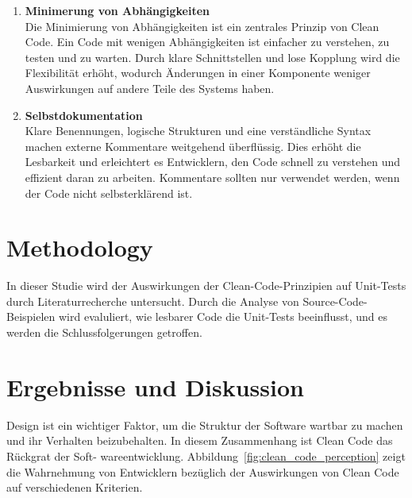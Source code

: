 \documentclass[conference]{IEEEtran}
\begin{document}
\begin{enumerate}
    \item \textbf{Minimerung von Abhängigkeiten}\\
    Die Minimierung von Abhängigkeiten ist ein zentrales Prinzip von Clean Code. Ein Code mit wenigen Abhängigkeiten ist einfacher zu verstehen, zu testen und zu warten. Durch klare Schnittstellen und lose Kopplung wird die Flexibilität erhöht, wodurch Änderungen in einer Komponente weniger Auswirkungen auf andere Teile des Systems haben.
    
    \item \textbf{Selbstdokumentation}\\
    Klare Benennungen, logische Strukturen und eine verständliche Syntax machen externe Kommentare weitgehend überflüssig. Dies erhöht die Lesbarkeit und erleichtert es Entwicklern, den Code schnell zu verstehen und effizient daran zu arbeiten. Kommentare sollten nur verwendet werden, wenn der Code nicht selbsterklärend ist.

\end{enumerate}
    
\section{Methodology}
In dieser Studie wird der Auswirkungen der Clean-Code-Prinzipien auf Unit-Tests durch
Literaturrecherche untersucht. Durch die Analyse von Source-Code-Beispielen wird evaluliert,
wie lesbarer Code die Unit-Tests beeinflusst, und es werden die Schlussfolgerungen
getroffen.

\section{Ergebnisse und Diskussion}
Design ist ein wichtiger Faktor, um die Struktur der Software wartbar zu machen und ihr
Verhalten beizubehalten. In diesem Zusammenhang ist Clean Code das Rückgrat der Soft-
wareentwicklung. Abbildung~\ref{fig:clean_code_perception} zeigt die Wahrnehmung von Entwicklern bezüglich der Auswirkungen von Clean Code auf verschiedenen Kriterien.
\end{document}
